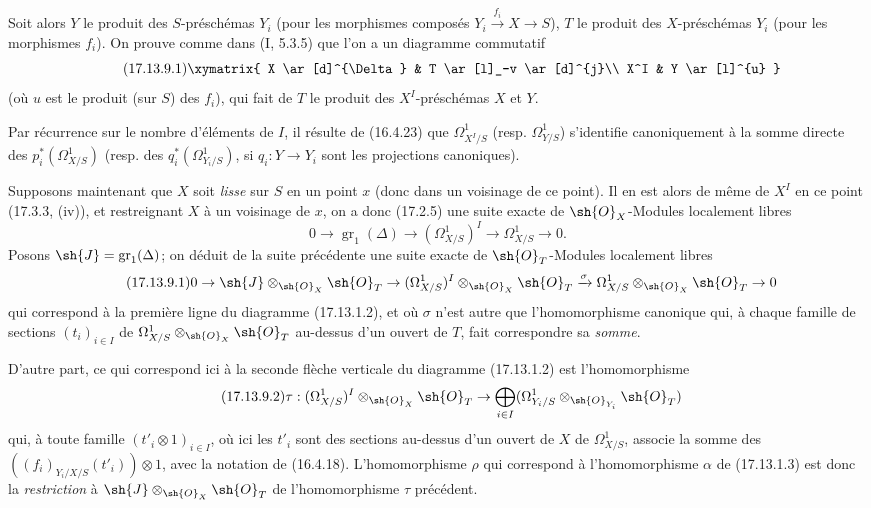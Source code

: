 
Soit alors $Y$ le produit des $S$-préschémas $Y_i$ (pour les morphismes composés $Y_i\xrightarrow{f_i}X\to S$), $T$ le produit des $X$-préschémas $Y_i$ (pour les morphismes $f_i$). On prouve comme dans (I, 5.3.5) que l'on a un diagramme commutatif
\[
\label{IV.17.13.9.1}
\tag{17.13.9.1}
\xymatrix{
  X \ar[d]^{\Delta} & T \ar[l]_-v \ar[d]^{j}\\
  X^I & Y \ar[l]^{u}
}
\]
(où $u$ est le produit (sur $S$) des $f_i$), qui fait de $T$ le produit des $X^I$-préschémas $X$ et $Y$.

Par récurrence sur le nombre d'éléments de $I$, il résulte de (16.4.23) que $\Omega^1_{X^I/S}$ (resp. $\Omega^1_{Y/S}$) s'identifie canoniquement à la somme directe des $p_i^*(\Omega^1_{X/S})$ (resp. des $q_i^*(\Omega^1_{Y_i/S})$, si $q_i:Y\to Y_i$ sont les projections canoniques).

Supposons maintenant que $X$ soit \emph{lisse} sur $S$ en un point $x$ (donc dans un voisinage de ce point). Il en est alors de même de $X^I$ en ce point (17.3.3, (iv)), et restreignant $X$ à un voisinage de $x$, on a donc (17.2.5) une suite exacte de $\sh{O}_X$-Modules localement libres
\[
0\to\operatorname{gr}_1(\Delta)\to(\Omega^1_{X/S})^I\to\Omega^1_{X/S}\to0.
\]
Posons $\sh{J}=\operatorname{gr}_1(\Delta)$; on déduit de la suite précédente une suite exacte de $\sh{O}_T$-Modules localement libres
\[
\label{IV.17.13.9.1-seq}
\tag{17.13.9.1}
0\to\sh{J}\otimes_{\sh{O}_X}\sh{O}_T\to(\Omega^1_{X/S})^I\otimes_{\sh{O}_X}\sh{O}_T\xrightarrow{\sigma}\Omega^1_{X/S}\otimes_{\sh{O}_X}\sh{O}_T\to0
\]
qui correspond à la première ligne du diagramme (17.13.1.2), et où $\sigma$ n'est autre que l'homomorphisme canonique qui, à chaque famille de sections $(t_i)_{i\in I}$ de $\Omega^1_{X/S}\otimes_{\sh{O}_X}\sh{O}_T$ au-dessus d'un ouvert de $T$, fait correspondre sa \emph{somme}.

D'autre part, ce qui correspond ici à la seconde flèche verticale du diagramme (17.13.1.2) est l'homomorphisme
\[
\label{IV.17.13.9.2}
\tag{17.13.9.2}
\tau:(\Omega^1_{X/S})^I\otimes_{\sh{O}_X}\sh{O}_T\to\bigoplus_{i\in I}(\Omega^1_{Y_i/S}\otimes_{\sh{O}_{Y_i}}\sh{O}_T)
\]
qui, à toute famille $(t'_i\otimes1)_{i\in I}$, où ici les $t'_i$ sont des sections au-dessus d'un ouvert de $X$ de $\Omega^1_{X/S}$, associe la somme des $((f_i)_{Y_i/X/S}(t'_i))\otimes1$, avec la notation de (16.4.18). L'homomorphisme $\rho$ qui correspond à l'homomorphisme $\alpha$ de (17.13.1.3) est donc la \emph{restriction} à $\sh{J}\otimes_{\sh{O}_X}\sh{O}_T$ de l'homomorphisme $\tau$ précédent.

